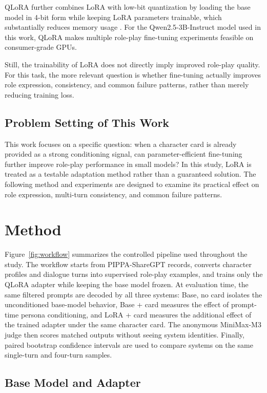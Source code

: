 \documentclass{article}
\newcommand{\base}{Base, no card\xspace}
\newcommand{\card}{Base + card\xspace}
\newcommand{\lora}{LoRA + card\xspace}
\begin{document}
QLoRA further combines LoRA with low-bit quantization by loading the base model
in 4-bit form while keeping LoRA parameters trainable, which substantially
reduces memory usage \citep{dettmers2023qlora}. For the Qwen2.5-3B-Instruct
model used in this work, QLoRA makes multiple role-play fine-tuning experiments
feasible on consumer-grade GPUs.

Still, the trainability of LoRA does not directly imply improved role-play
quality. For this task, the more relevant question is whether fine-tuning
actually improves role expression, consistency, and common failure patterns,
rather than merely reducing training loss.

\subsection{Problem Setting of This Work}

This work focuses on a specific question: when a character card is already
provided as a strong conditioning signal, can parameter-efficient fine-tuning
further improve role-play performance in small models? In this study, LoRA is
treated as a testable adaptation method rather than a guaranteed solution. The
following method and experiments are designed to examine its practical effect
on role expression, multi-turn consistency, and common failure patterns.

\section{Method}

\figWorkflow

Figure~\ref{fig:workflow} summarizes the controlled pipeline used throughout
the study. The workflow starts from PIPPA-ShareGPT records, converts character
profiles and dialogue turns into supervised role-play examples, and trains only
the QLoRA adapter while keeping the base model frozen. At evaluation time, the
same filtered prompts are decoded by all three systems: \base isolates the
unconditioned base-model behavior, \card measures the effect of prompt-time
persona conditioning, and \lora measures the additional effect of the trained
adapter under the same character card. The anonymous MiniMax-M3 judge then
scores matched outputs without seeing system identities. Finally, paired
bootstrap confidence intervals are used to compare systems on the same
single-turn and four-turn samples.

\subsection{Base Model and Adapter}
\end{document}
